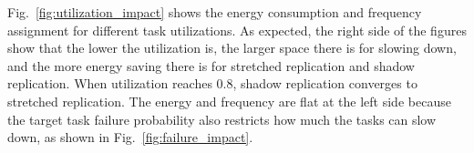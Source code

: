 Fig.~\ref{fig:utilization_impact} shows the energy consumption and frequency assignment for different task utilizations. As expected, the right side of the figures show that the lower the utilization is, the larger space there is for slowing down, and the more energy saving there is for stretched replication and shadow replication. When utilization reaches 0.8, shadow replication converges to stretched replication. The energy and frequency are flat at the left side because the target task failure probability also restricts how much the tasks can slow down, as shown in Fig.~\ref{fig:failure_impact}. 
